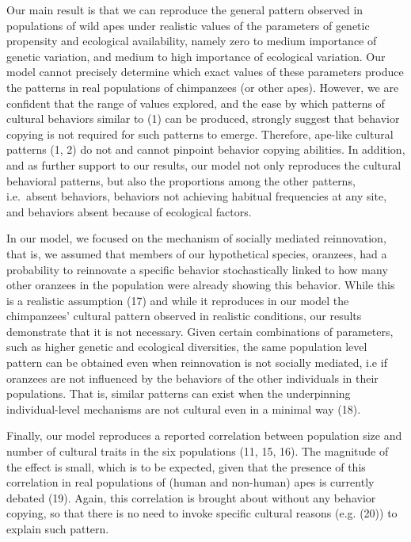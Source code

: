 \documentclass[9pt,twocolumn,twoside,]{pnas-new}
\begin{document}
Our main result is that we can reproduce the general pattern observed in
populations of wild apes under realistic values of the parameters of
genetic propensity and ecological availability, namely zero to medium
importance of genetic variation, and medium to high importance of
ecological variation. Our model cannot precisely determine which exact
values of these parameters produce the patterns in real populations of
chimpanzees (or other apes). However, we are confident that the range of
values explored, and the ease by which patterns of cultural behaviors
similar to (1) can be produced, strongly suggest that behavior copying
is not required for such patterns to emerge. Therefore, ape-like
cultural patterns (1, 2) do not and cannot pinpoint behavior copying
abilities. In addition, and as further support to our results, our model
not only reproduces the cultural behavioral patterns, but also the
proportions among the other patterns, i.e.~absent behaviors, behaviors
not achieving habitual frequencies at any site, and behaviors absent
because of ecological factors.

In our model, we focused on the mechanism of socially mediated
reinnovation, that is, we assumed that members of our hypothetical
species, oranzees, had a probability to reinnovate a specific behavior
stochastically linked to how many other oranzees in the population were
already showing this behavior. While this is a realistic assumption (17)
and while it reproduces in our model the chimpanzees' cultural pattern
observed in realistic conditions, our results demonstrate that it is not
necessary. Given certain combinations of parameters, such as higher
genetic and ecological diversities, the same population level pattern
can be obtained even when reinnovation is not socially mediated, i.e if
oranzees are not influenced by the behaviors of the other individuals in
their populations. That is, similar patterns can exist when the
underpinning individual-level mechanisms are not cultural even in a
minimal way (18).

Finally, our model reproduces a reported correlation between population
size and number of cultural traits in the six populations (11, 15, 16).
The magnitude of the effect is small, which is to be expected, given
that the presence of this correlation in real populations of (human and
non-human) apes is currently debated (19). Again, this correlation is
brought about without any behavior copying, so that there is no need to
invoke specific cultural reasons (e.g. (20)) to explain such pattern.
\end{document}
